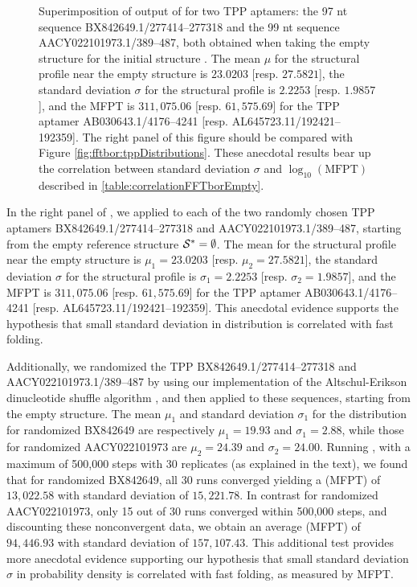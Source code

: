 \begin{figure}[!ht]
{Superimposition of output of \fftbor for two TPP \rb aptamers: the
97 nt sequence BX842649.1/277414--277318 and the
99 nt sequence AACY022101973.1/389--487, both obtained when
taking the empty structure for the initial structure \strSt.
The mean $\mu$ for the \fftbor structural profile near the empty
structure is $23.0203$  [resp. $27.5821$], the
standard deviation $\sigma$ for the \fftbor structural profile
is $2.2253$  [resp. $1.9857$], and the \kinfold MFPT is
$311,075.06$ [resp. $61,575.69$] for the TPP \rb aptamer
AB030643.1/4176--4241 [resp. AL645723.11/192421--192359].
The right panel of this figure should be compared with Figure
\ref{fig:fftbor:tppDistributions}.
These anecdotal results bear up the correlation between standard deviation
$\sigma$ and $\log_{10}(\text{MFPT})$ described in \ref{table:correlationFFTborEmpty}.
}
\label{fig:fftbor:correlationFFTborEmpty}
\end{figure}

In the right panel of , we
applied \fftbor to each of the two randomly chosen TPP \rb
aptamers BX842649.1/277414--277318 and AACY022101973.1/389--487, starting
from the empty reference structure $\mathcal S^*=\emptyset$.
The mean for the \fftbor structural profile near the empty
structure is $\mu_1=23.0203$  [resp. $\mu_2=27.5821$], the
standard deviation $\sigma$ for the \fftbor structural profile
is $\sigma_1=2.2253$  [resp. $\sigma_2=1.9857$], and the \kinfold MFPT is
$311,075.06$ [resp. $61,575.69$] for the TPP \rb aptamer
AB030643.1/4176--4241 [resp.  AL645723.11/192421--192359]. This anecdotal evidence supports the hypothesis that small standard deviation in \fftbor distribution is correlated with fast folding.

Additionally, we randomized the TPP \rbs BX842649.1/277414--277318 and AACY022101973.1/389--487 by using our implementation of the Altschul-Erikson dinucleotide shuffle algorithm
\citep{altschulErikson:dinucleotideShuffle}, and then applied \fftbor to these
sequences, starting from the empty structure.  The mean $\mu_1$ and standard
deviation $\sigma_1$ for the \fftbor distribution for randomized BX842649 are
respectively $\mu_1=19.93$ and $\sigma_1=2.88$, while those for randomized
AACY022101973 are $\mu_2=24.39$ and $\sigma_2=24.00$. Running \kinfold, with a
maximum of 500,000 steps with 30 replicates (as explained in the text), we
found
that for randomized BX842649, all 30 runs converged yielding a \mfpt
(MFPT) of $13,022.58$ with standard deviation of $15,221.78$. In contrast for
randomized AACY022101973, only 15 out of 30 runs converged within 500,000 steps,
and discounting these nonconvergent data, we obtain an average \mfpt
(MFPT) of $94,446.93$ with standard deviation of $157,107.43$. This additional
test provides more anecdotal evidence supporting our hypothesis that small
standard deviation $\sigma$ in \fftbor probability density is correlated with fast folding, as measured by MFPT.

